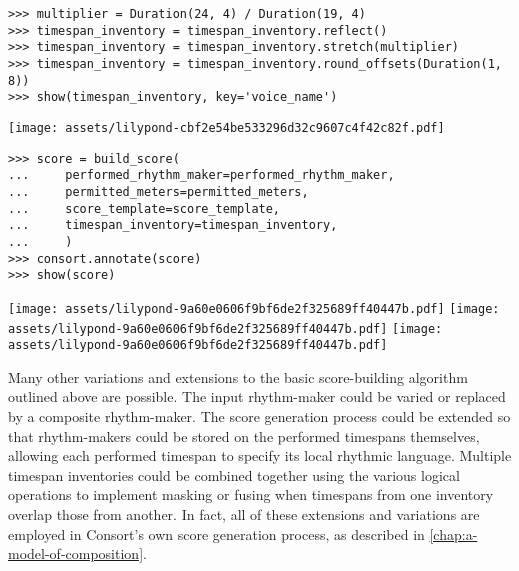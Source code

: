 \begin{abjadbookoutput}
\begin{singlespacing}
\vspace{-0.5\baselineskip}
\begin{lstlisting}
>>> multiplier = Duration(24, 4) / Duration(19, 4)
>>> timespan_inventory = timespan_inventory.reflect()
>>> timespan_inventory = timespan_inventory.stretch(multiplier)
>>> timespan_inventory = timespan_inventory.round_offsets(Duration(1, 8))
>>> show(timespan_inventory, key='voice_name')
\end{lstlisting}
\noindent\texttt{[image: assets/lilypond-cbf2e54be533296d32c9607c4f42c82f.pdf]}
\begin{lstlisting}
>>> score = build_score(
...     performed_rhythm_maker=performed_rhythm_maker,
...     permitted_meters=permitted_meters,
...     score_template=score_template,
...     timespan_inventory=timespan_inventory,
...     )
>>> consort.annotate(score)
>>> show(score)
\end{lstlisting}
\noindent\texttt{[image: assets/lilypond-9a60e0606f9bf6de2f325689ff40447b.pdf]}
\newline
\newline
\noindent\texttt{[image: assets/lilypond-9a60e0606f9bf6de2f325689ff40447b.pdf]}
\newline
\newline
\noindent\texttt{[image: assets/lilypond-9a60e0606f9bf6de2f325689ff40447b.pdf]}
\end{singlespacing}
\end{abjadbookoutput}

\noindent Many other variations and extensions to the basic score-building
algorithm outlined above are possible. The input rhythm-maker could be varied
or replaced by a composite rhythm-maker. The score generation process could be
extended so that rhythm-makers could be stored on the performed timespans
themselves, allowing each performed timespan to specify its local rhythmic
language. Multiple timespan inventories could be combined together using the
various logical operations to implement masking or fusing when timespans from
one inventory overlap those from another. In fact, all of these extensions and
variations are employed in Consort's own score generation process, as described
in \autoref{chap:a-model-of-composition}.